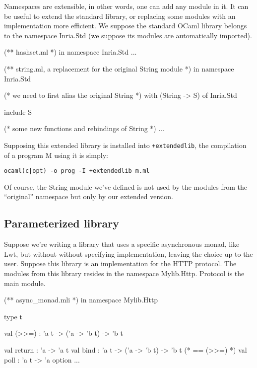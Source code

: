 Namespaces are extensible, in other words, one can add any module in it. It can
be useful to extend the standard library, or replacing some modules with an
implementation more efficient. We suppose the standard OCaml library belongs to
the namespace Inria.Std (we suppose its modules are automatically
imported).

\begin{OCaml}
(** hashset.ml *)
in namespace Inria.Std
...
\end{OCaml}

\begin{OCaml}
(** string.ml, a replacement for the original String module *)
in namespace Inria.Std

(* we need to first alias the original String *)
  with (String -> S) of Inria.Std

include S

(* some new functions and rebindings of String *)
...
\end{OCaml}

Supposing this extended library is installed into \texttt{+extendedlib}, the
compilation of a program M using it is simply:
\begin{verbatim}
ocaml(c|opt) -o prog -I +extendedlib m.ml
\end{verbatim}

Of course, the String module we've defined is not used by the modules from the
``original'' namespace but only by our extended version.

\subsection{Parameterized library}

Suppose we're writing a library that uses a specific asynchronous monad, like
Lwt, but without without specifying implementation, leaving the choice up to the
user. Suppose this library is an implementation for the HTTP protocol. The modules
from this library resides in the namespace Mylib.Http. Protocol is the main module.

\begin{OCaml}
(** async_monad.mli *)
in namespace Mylib.Http

type t

val (>>=) : 'a t -> ('a -> 'b t) -> 'b t

val return : 'a -> 'a t
val bind : 'a t -> ('a -> 'b t) -> 'b t (* == (>>=) *)
val poll : 'a t -> 'a option
...
\end{OCaml}

